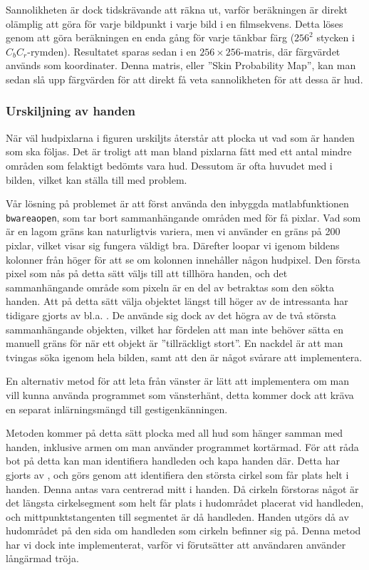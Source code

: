 \documentclass[../rapport_MVEX01-11-05]{subfiles}
\begin{document}
Sannolikheten är dock tidskrävande att räkna ut, varför beräkningen
är direkt olämplig att göra för varje bildpunkt i varje bild i en
filmsekvens. Detta löses genom att göra beräkningen en enda gång för
varje tänkbar färg ($256^2$ stycken i $C_bC_r$-rymden). Resultatet sparas
sedan i en $256\times256$-matris, där färgvärdet används som koordinater.
Denna matris, eller ''Skin Probability Map'', kan man sedan slå upp
färgvärden för att direkt få veta sannolikheten för att dessa är hud.

\subsubsection{Urskiljning av handen}

När väl hudpixlarna i figuren urskiljts återstår att plocka ut
vad som är handen som ska följas. Det är troligt att man bland
pixlarna fått med ett antal mindre områden som felaktigt bedömts vara
hud. Dessutom är ofta huvudet med i bilden, vilket kan ställa till med
problem. 

Vår lösning på problemet är att först använda den inbyggda
matlabfunktionen \texttt{bwareaopen}, som tar bort sammanhängande 
områden med för få pixlar. Vad som är en lagom gräns kan naturligtvis
variera, men vi använder en gräns på 200 pixlar, vilket visar sig
fungera väldigt bra. Därefter loopar vi igenom bildens kolonner från
höger för att se om kolonnen innehåller någon hudpixel. Den första
pixel som nås på detta sätt väljs till att tillhöra handen, och det
sammanhängande område som pixeln är en del av betraktas som den sökta
handen. Att på detta sätt välja objektet längst till höger av de
intressanta har tidigare gjorts av bl.a. . De använde
sig dock av det högra av de två största sammanhängande objekten,
vilket har fördelen att man inte behöver sätta en manuell gräns för
när ett objekt är ''tillräckligt stort''. En nackdel är att man tvingas
söka igenom hela bilden, samt att den är något svårare att
implementera.

En alternativ metod för att leta från
vänster är lätt att implementera om man vill kunna använda programmet
som vänsterhänt, detta kommer dock att kräva en
separat inlärningsmängd till gestigenkänningen.

Metoden kommer på detta sätt plocka med all hud som hänger samman med
handen, inklusive armen om man använder programmet kortärmad. För att
råda bot på detta kan man identifiera handleden och kapa handen
där. Detta har gjorts av , och
görs genom att identifiera den största cirkel
som får plats helt i handen. Denna antas vara centrerad mitt i handen. Då
cirkeln förstoras något är det längsta cirkelsegment som helt får
plats i hudområdet placerat vid handleden, och mittpunktstangenten
till segmentet är då handleden. Handen utgörs då av hudområdet på den
sida om handleden som cirkeln befinner sig på. Denna metod har vi dock
inte implementerat, varför vi förutsätter att användaren använder
långärmad tröja. 
\end{document}
